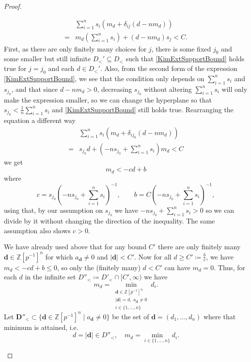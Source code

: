 \documentclass[10pt,twoside]{article}
\numberwithin{equation}{section}
\theoremstyle{plain}
\theoremstyle{definition}
\newcommand{\ZZ}{\mathbb{Z}}
\newcommand{\ZZip}{\ZZ[p^{-1}]}
\begin{document}
\begin{proof}
\begin{itemize}
        \begin{align*}
            &\sum_{i=1}^n s_i\left(m_d + \delta_{ij}(d-nm_d)\right)\\
        =&m_d\left(\sum_{i=1}^n s_i \right)+ (d-nm_d)s_{j}
        <C\tag{*}\label{KimExtSupportBound}.
        \end{align*}
        First, as there are only finitely many choices for \(j\), there is some fixed \(j_0\) and some smaller but still infinite \(D_{<}'\subseteq D_{<}\) such that \eqref{KimExtSupportBound} holds true for \(j=j_0\) and each \(d\in D_{<}'\). Also, from the second form of the expression \eqref{KimExtSupportBound}, we see that the condition only depends on \(\sum_{i=1}^n s_i\) and \(s_{j_0}\), and that since \(d-nm_d>0\), decreasing \(s_{j_0}\) without altering \(\sum_{i=1}^n s_i\) will only make the expression smaller, so we can change the hyperplane so that \(s_{j_0}<\frac 1n\sum_{i=1}^n s_i\) and \eqref{KimExtSupportBound} still holds true.
        Rearranging the equation a different way
        \begin{align*}&\sum_{i=1}^n s_i\left(m_d + \delta_{ij_0}(d-nm_d)\right)\\=
        &s_{j_0}d+
        \left(-ns_{j_0}+\sum_{i=1}^ns_i\right)m_d<C
        \end{align*}
        we get
        \[m_d < -cd+b\]
        where
        \[c=s_{j_0}\left(-ns_{j_0}+\sum_{i=1}^ns_i\right)^{-1}, \qquad b=C\left(-ns_{j_0}+\sum_{i=1}^ns_i\right)^{-1},\]
        using that, by our assumption on \(s_{j_0}\) we have \(-ns_{j_0}+\sum_{i=1}^ns_i>0\) so we can divide by it without changing the direction of the inequality. The same assumption also shows \(c>0\). \par
        We have already used above that for any bound \(C'\) there are only finitely many \(\mathbf d\in \ZZip^n\) for which \(a_{\mathbf d} \neq 0\) and \(|\mathbf d|<C'\). Now for all \(d\geq C'\coloneqq\frac{b}{c}\), we have \(m_d < -cd+b \leq 0\), so only the (finitely many) \(d<C'\) can have \(m_d=0\). Thus, for each \(d\) in the infinite set \(D''_<\coloneqq D'_<\cap [C',\infty)\) we have 
        \[m_d=\min_{\substack{\mathbf d\in \ZZip^n\\|\mathbf d|=d,\;a_{\mathbf d}\neq 0\\i\in\{1,\dots,n\}}} d_i.\]
        Let \(\mathbf D''_< \subset \{\mathbf{d}\in\ZZip^n\mid a_\mathbf{d} \neq 0\}\) be the set of \(\mathbf d=(d_1,\dots, d_n)\) where that minimum is attained, i.e. 
        \[d=|\mathbf d|\in D''_<, \quad m_d = \min_{i\in \{1,\dots, n\}} d_i.\]

\end{itemize}
\end{proof}
\end{document}
